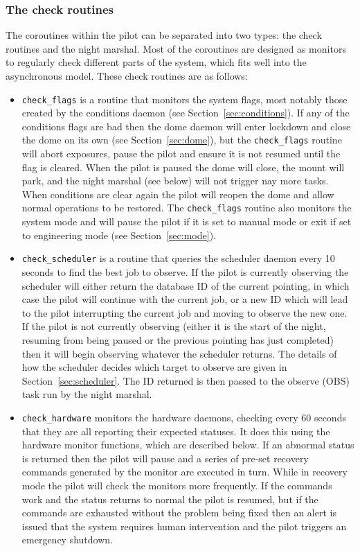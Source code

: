 \begin{colsection}
\begin{colsection}
\subsubsection{The check routines}

The coroutines within the pilot can be separated into two types: the check routines and the night marshal. Most of the coroutines are designed as monitors to regularly check different parts of the system, which fits well into the asynchronous model. These check routines are as follows:

\begin{itemize}

\item \texttt{check\_flags} is a routine that monitors the system flags, most notably those created by the conditions daemon (see Section~\ref{sec:conditions}). If any of the conditions flags are bad then the dome daemon will enter lockdown and close the dome on its own (see Section~\ref{sec:dome}), but the \texttt{check\_flags} routine will abort exposures, pause the pilot and ensure it is not resumed until the flag is cleared. When the pilot is paused the dome will close, the mount will park, and the night marshal (see below) will not trigger nay more tasks. When conditions are clear again the pilot will reopen the dome and allow normal operations to be restored. The \texttt{check\_flags} routine also monitors the system mode and will pause the pilot if it is set to manual mode or exit if set to engineering mode (see Section~\ref{sec:mode}).

\item \texttt{check\_scheduler} is a routine that queries the scheduler daemon every 10 seconds to find the best job to observe. If the pilot is currently observing the scheduler will either return the database ID of the current pointing, in which case the pilot will continue with the current job, or a new ID which will lead to the pilot interrupting the current job and moving to observe the new one. If the pilot is not currently observing (either it is the start of the night, resuming from being paused or the previous pointing has just completed) then it will begin observing whatever the scheduler returns. The details of how the scheduler decides which target to observe are given in Section~\ref{sec:scheduler}. The ID returned is then passed to the observe (OBS) task run by the night marshal.

\item \texttt{check\_hardware} monitors the hardware daemons, checking every 60 seconds that they are all reporting their expected statuses. It does this using the hardware monitor functions, which are described below. If an abnormal status is returned then the pilot will pause and a series of pre-set recovery commands generated by the monitor are executed in turn. While in recovery mode the pilot will check the monitors more frequently. If the commands work and the status returns to normal the pilot is resumed, but if the commands are exhausted without the problem being fixed then an alert is issued that the system requires human intervention and the pilot triggers an emergency shutdown.


\end{itemize}
\end{colsection}
\end{colsection}
